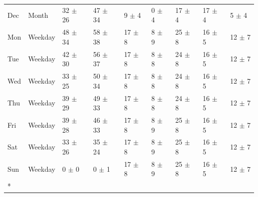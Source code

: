 \begin{longtable}[t]{lllllllll}
Dec & Month & 32 $\pm$ 26 & 47 $\pm$ 34 & 9 $\pm$ 4 & 0 $\pm$ 4 & 17 $\pm$ 4 & 17 $\pm$ 4 & 5 $\pm$ 4\\
Mon & Weekday & 48 $\pm$ 34 & 58 $\pm$ 38 & 17 $\pm$ 8 & 8 $\pm$ 9 & 25 $\pm$ 8 & 16 $\pm$ 5 & 12 $\pm$ 7\\
Tue & Weekday & 42 $\pm$ 30 & 56 $\pm$ 37 & 17 $\pm$ 8 & 8 $\pm$ 8 & 24 $\pm$ 8 & 16 $\pm$ 5 & 12 $\pm$ 7\\
Wed & Weekday & 33 $\pm$ 25 & 50 $\pm$ 34 & 17 $\pm$ 8 & 8 $\pm$ 8 & 24 $\pm$ 8 & 16 $\pm$ 5 & 12 $\pm$ 7\\
Thu & Weekday & 39 $\pm$ 29 & 49 $\pm$ 33 & 17 $\pm$ 8 & 8 $\pm$ 8 & 24 $\pm$ 8 & 16 $\pm$ 5 & 12 $\pm$ 7\\
Fri & Weekday & 39 $\pm$ 28 & 46 $\pm$ 33 & 17 $\pm$ 8 & 8 $\pm$ 9 & 25 $\pm$ 8 & 16 $\pm$ 5 & 12 $\pm$ 7\\
Sat & Weekday & 33 $\pm$ 26 & 35 $\pm$ 24 & 17 $\pm$ 8 & 8 $\pm$ 9 & 25 $\pm$ 8 & 16 $\pm$ 5 & 12 $\pm$ 7\\
Sun & Weekday & 0 $\pm$ 0 & 0 $\pm$ 1 & 17 $\pm$ 8 & 8 $\pm$ 9 & 25 $\pm$ 8 & 16 $\pm$ 5 & 12 $\pm$ 7\\*
\end{longtable}
\endgroup{}
